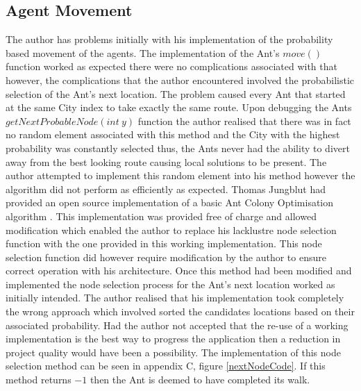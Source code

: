 \subsection{Agent Movement}
\label{antyMove}
The author has problems initially with his implementation of the probability based movement of the agents. The implementation of the Ant's $move()$ function worked as expected there were no complications associated with that however, the complications that the author encountered involved the probabilistic selection of the Ant's next location. The problem caused every Ant that started at the same City index to take exactly the same route. Upon debugging the Ants $getNextProbableNode(int\ y)$ function the author realised that there was in fact no random element associated with this method and the City with the highest probability was constantly selected thus, the Ants never had the ability to divert away from the best looking route causing local solutions to be present. The author attempted to implement this random element into his method however the algorithm did not perform as efficiently as expected. Thomas Jungblut had provided an open source implementation of a basic Ant Colony Optimisation algorithm \cite{tjung:aco:blog}. This implementation was provided free of charge and allowed modification which enabled the author to replace his lacklustre node selection function with the one provided in this working implementation. This node selection function did however require modification by the author to ensure correct operation with his architecture. Once this method had been modified and implemented the node selection process for the Ant's next location worked as initially intended. The author realised that his implementation took completely the wrong approach which involved sorted the candidates locations based on their associated probability. Had the author not accepted that the re-use of a working implementation is the best way to progress the application then a reduction in project quality would have been a possibility. The implementation of this node selection method can be seen in appendix C, figure \ref{nextNodeCode}. If this method returns $-1$ then the Ant is deemed to have completed its walk.

